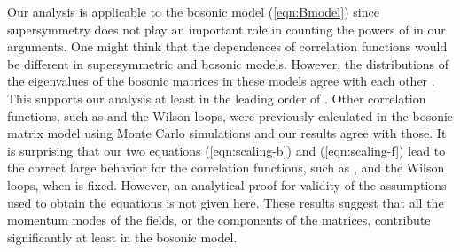 \documentclass[12pt,a4paper]{article}
\providecommand{\Tr}{\mbox{\rm Tr}}
\begin{document}
Our analysis is applicable to the bosonic model (\ref{eqn:Bmodel})
since supersymmetry does not play an important role in counting
the powers of \coordHE{} in our arguments.
One might think that the \coordHE{} dependences of correlation functions
would be different in supersymmetric and bosonic models. However,
the distributions of the eigenvalues of the bosonic matrices in these
models agree with each other \cite{AIKKT,MCsimu}. This supports
our analysis at least in the leading order of \coordHE{}.
Other correlation functions, such as \myHighlight{$\langle\frac{1}{g^2}\Tr
A^4\rangle$}\coordHE{} and the Wilson loops, were previously calculated
in the bosonic matrix model using Monte Carlo simulations
\cite{MCsimu,alpha} and our results agree with those.
It is surprising that our two equations (\ref{eqn:scaling-b}) and
(\ref{eqn:scaling-f}) lead to the correct large \coordHE{} behavior for
the correlation functions, such as \myHighlight{$\langle\frac{1}{N}\Tr A^2\rangle$}\coordHE{},
\myHighlight{$\langle\frac{1}{g^2}\Tr A^4\rangle$}\coordHE{} and the Wilson loops, when \coordHE{}
is fixed. However, an analytical proof for validity of the
assumptions used to obtain the equations is not given here.
These results suggest that all the momentum modes of the fields, or the
components of the matrices, contribute significantly at least in the
bosonic model.
\end{document}

